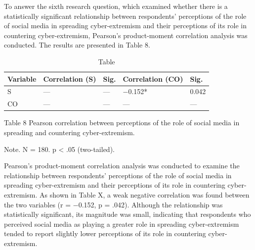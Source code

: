\documentclass[10pt]{NSP1}
\begin{document}
\par\medskip{}\smallskip

To answer the sixth research question, which examined whether there is a statistically significant relationship between respondents' perceptions of the role of social media in spreading cyber-extremism and their perceptions of its role in countering cyber-extremism, Pearson's product-moment correlation analysis was conducted. The results are presented in Table 8.

\begin{table}[tbp]
\centering
{\small
\begin{tabular}{|p{}|p{}|p{}|p{}|p{}|}
\hline
\cellcolor[HTML]{DDD9C3}\textbf{Variable} & \cellcolor[HTML]{DDD9C3}\textbf{Correlation (S)} & \cellcolor[HTML]{DDD9C3}\textbf{Sig.} & \cellcolor[HTML]{DDD9C3}\textbf{Correlation (CO)} & \cellcolor[HTML]{DDD9C3}\textbf{Sig.} \\
\hline
\cellcolor[HTML]{DDD9C3}S & — & — & −0.152* & 0.042 \\
\hline
\cellcolor[HTML]{DDD9C3}CO & — & — & — & — \\
\hline
\end{tabular}}
\caption{Table}

\end{table}

Table 8 Pearson correlation between perceptions of the role of social media in spreading and countering cyber-extremism.

Note. N = 180. p \textless{} .05 (two-tailed).

Pearson's product-moment correlation analysis was conducted to examine the relationship between respondents' perceptions of the role of social media in spreading cyber-extremism and their perceptions of its role in countering cyber-extremism. As shown in Table X, a weak negative correlation was found between the two variables (r = −0.152, p = .042). Although the relationship was statistically significant, its magnitude was small, indicating that respondents who perceived social media as playing a greater role in spreading cyber-extremism tended to report slightly lower perceptions of its role in countering cyber-extremism.
\end{document}
